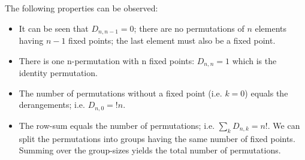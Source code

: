 The following properties can be observed:

\begin{itemize}
\item
  It can be seen that \(D_{n,n-1} = 0\); there are no permutations of
  \(n\) elements having \(n-1\) fixed points; the last element must also
  be a fixed point.
\item
  There is one n-permutation with n fixed points: \(D_{n,n} = 1\) which
  is the identity permutation.
\item
  The number of permutations without a fixed point (i.e. \(k=0\)) equals
  the derangements; i.e. \(D_{n,0} = !n\).
\item
  The row-sum equals the number of permutations; i.e.
  \(\sum_{k} D_{n,k} = n!\). We can split the permutations into groups
  having the same number of fixed points. Summing over the group-sizes
  yields the total number of permutations.
\end{itemize}
